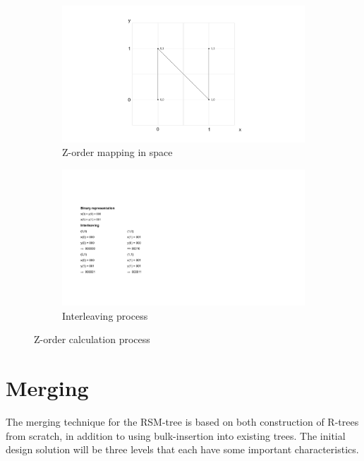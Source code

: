 \begin{figure}[ht]
     \centering
     \begin{subfigure}{0.45\textwidth}
         \centering
         \includegraphics[width=\textwidth]{figures/zorder_process_graph.pdf}
         \caption{Z-order mapping in space}
         \label{fig:zspace}
     \end{subfigure}
     \hfill
      \begin{subfigure}{0.45\textwidth}
     \centering
     \includegraphics[width=\textwidth]{figures/zorder_process_interleaving.pdf}
     \caption{Interleaving process}
     \label{fig:zinterleave}
     \end{subfigure}
    \hfill
    \caption{Z-order calculation process}
    \label{fig:bitInterleaving}
\end{figure}

\section{Merging}
\label{sect:RSM-Merging}
The merging technique for the RSM-tree is based on both construction of R-trees from scratch, in addition to using bulk-insertion into existing trees. The initial design solution will be three levels that each have some important characteristics. 

